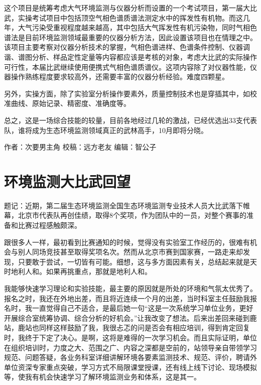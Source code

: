 \documentclass[
]{book}
\begin{document}
这个项目是统筹考虑大气环境监测与仪器分析而设置的一个考试项目，第一届大比武，实操考试项目中包括顶空气相色谱质谱法测定水中的挥发性有机物。而这几年，大气污染受重视程度越来越高，其中包括大气挥发性有机污染物，同时气相色谱法是目前环境监测领域最重要的仪器分析方法，因此设置该项目也在情理之中。该项目主要考察对仪器分析技术的掌握，气相色谱进样、色谱条件控制、仪器调谐、谱图分析、样品定性定量等内容都应该是考核的对象，考虑大比武的实际操作可行性，本届比武继续使用便携式气相色谱质谱仪。这项内容除了对仪器性能，仪器操作熟练程度要求较高外，还需要丰富的仪器分析经验。难度四颗星。

另外，实操方面，除了实验室分析操作要素外，质量控制技术也是穿插其中，如校准曲线、原始记录、精密度、准确度等。

总之，这是一场综合技能的较量，目前各地经过几轮的激战，已经优选出33支代表队，谁将成为生态环境监测领域真正的武林高手，10月即将分晓。

作者：次要男主角
校稿：远方老友
编辑：智公子

\hypertarget{ux73afux5883ux76d1ux6d4bux5927ux6bd4ux6b66ux56deux671b}{%
\section{环境监测大比武回望}\label{ux73afux5883ux76d1ux6d4bux5927ux6bd4ux6b66ux56deux671b}}

题记：近期，第二届生态环境监测全国生态环境监测专业技术人员大比武落下帷幕，北京市代表队再创佳绩，取得8个奖项，作为团队中的一员，对整个赛事的准备和比赛过程感触颇深。

跟很多人一样，最初看到比赛通知的时候，觉得没有实验室工作经历的，很难有机会与别人同场竞技甚至取得奖项名次。然而从北京市赛到国家赛，一路走来却发现，只要敢于尝试，一切皆有可能。细想，这与多方面因素有关，总结起来就是天时地利人和。如果再挑重点，那就是地利人和。

我能够快速学习理论和实验技能，最主要的原因就是所处的环境和气氛太优秀了。报名之时，我还在外地出差，而且将近连续一个月的出差，当时科室主任鼓励我报名时，我一直觉得自己不适合，是最后她一句``这是一次系统学习单位业务，更好开展综合室统筹协调、综合分析的好机会。''让我改变了想法。后来出差回来碰到鹿站，鹿站也同样这样鼓励了我，我很忐忑的问是否会有相应培训，得到肯定回复时，我终于下定了决心。是啊，这将是难得的一次学习机会。而且实际证明，单位在组织培训时，力度之大、范围之广、内容之深都是空前的，站领导亲自带领学习规范、问题答疑，各业务科室详细讲解环境各要素监测技术、规范、评价，聘请外单位资深专家重点突破，学习方式不局限课堂授课，还有线上线下讨论、现场模拟等，使我有机会快速学习了解环境监测业务和体系，这是其一。
\end{document}
